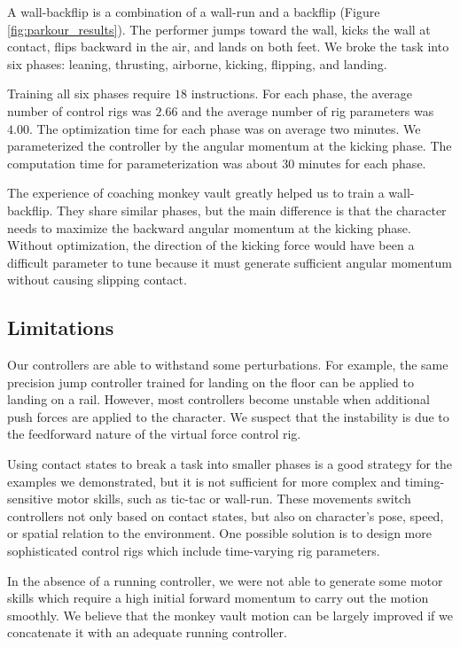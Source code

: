 A wall-backflip is a combination of a wall-run and a backflip
(Figure \ref{fig:parkour_results}). The performer jumps toward the wall, kicks
the wall at contact, flips backward in the air, and lands on both
feet. We broke the task into six phases: leaning, thrusting, airborne,
kicking, flipping, and landing.

Training all six phases require $18$ instructions.  For each phase,
the average number of control rigs was $2.66$ and the average number
of rig parameters was $4.00$.  The optimization time for each phase
was on average two minutes. We parameterized the controller by the
angular momentum at the kicking phase. The computation time for
parameterization was about 30 minutes for each phase.

The experience of coaching monkey vault greatly helped us to train a
wall-backflip. They share similar phases, but the main difference is
that the character needs to maximize the backward angular momentum at
the kicking phase. Without optimization, the direction of the kicking
force would have been a difficult parameter to tune because it must
generate sufficient angular momentum without causing slipping contact.


\subsection{Limitations}
Our controllers are able to withstand some perturbations. For example,
the same precision jump controller trained for landing on the floor
can be applied to landing on a rail. However, most controllers become
unstable when additional push forces are applied to the character. We
suspect that the instability is due to the feedforward nature of
the virtual force control rig.

Using contact states to break a task into smaller phases is a good
strategy for the examples we demonstrated, but it is not sufficient
for more complex and timing-sensitive motor skills, such as tic-tac or
wall-run. These movements switch controllers not only based on
contact states, but also on character's pose, speed, or spatial
relation to the environment. One possible solution is to design more
sophisticated control rigs which include time-varying rig parameters.

In the absence of a running controller, we were not able to generate
some motor skills which require a high initial forward momentum to
carry out the motion smoothly. We believe that the monkey vault motion
can be largely improved if we concatenate it with an adequate running
controller.

